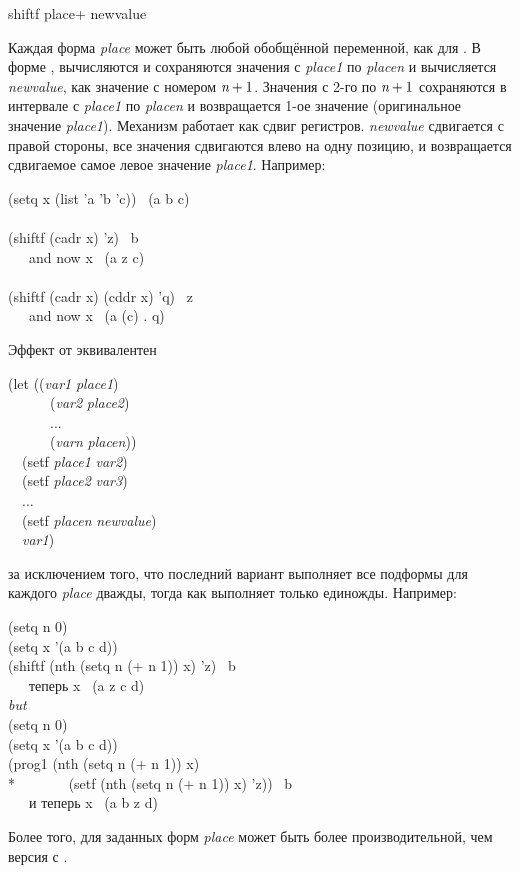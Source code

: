 \begin{defmac}
shiftf {place}+ newvalue

Каждая форма \emph{place} может быть любой обобщённой переменной, как для
. 
В форме , вычисляются и сохраняются значения с \emph{place1} по
\emph{placen} и вычисляется \emph{newvalue}, как значение с номером $\emph{n}+1$.
Значения с 2-го по $\emph{n}+1$ сохраняются в интервале с \emph{place1} по
\emph{placen} и возвращается 1-ое значение (оригинальное значение \emph{place1}).
Механизм работает как сдвиг регистров. \emph{newvalue} сдвигается с правой
стороны, все значения сдвигаются влево на одну позицию, и возвращается
сдвигаемое самое левое значение \emph{place1}. Например:
\begin{lisp}
(setq x (list 'a 'b 'c)) \EV\ (a b c) \\
 \\
(shiftf (cadr x) 'z) \EV\ b \\
~~~\textrm{and now} x \EV\ (a z c) \\
 \\
(shiftf (cadr x) (cddr x) 'q) \EV\ z \\
~~~\textrm{and now} x \EV\ (a (c) . q)
\end{lisp}
Эффект от  эквивалентен
\begin{lisp}
(let ((\emph{var1} \emph{place1}) \\
~~~~~~(\emph{var2} \emph{place2}) \\
~~~~~~... \\
~~~~~~(\emph{varn} \emph{placen})) \\
~~(setf \emph{place1} \emph{var2}) \\
~~(setf \emph{place2} \emph{var3}) \\
~~... \\
~~(setf \emph{placen} \emph{newvalue}) \\
~~\emph{var1})
\end{lisp}
за исключением того, что последний вариант выполняет все подформы для каждого
\emph{place} дважды, тогда как  выполняет только единожды.
Например:
\begin{lisp}
(setq n 0) \\
(setq x '(a b c d)) \\
(shiftf (nth (setq n (+ n 1)) x) 'z) \EV\ b \\
~~~\textrm{теперь} x \EV\ (a z c d) \\[4pt]
\emph{but} \\[4pt]
(setq n 0) \\
(setq x '(a b c d)) \\
(prog1 (nth (setq n (+ n 1)) x) \\*
~~~~~~~(setf (nth (setq n (+ n 1)) x) 'z)) \EV\ b \\
~~~\textrm{и теперь} x \EV\ (a b z d)
\end{lisp}
Более того, для заданных форм \emph{place}  может быть более
производительной, чем версия с .



\end{defmac}
